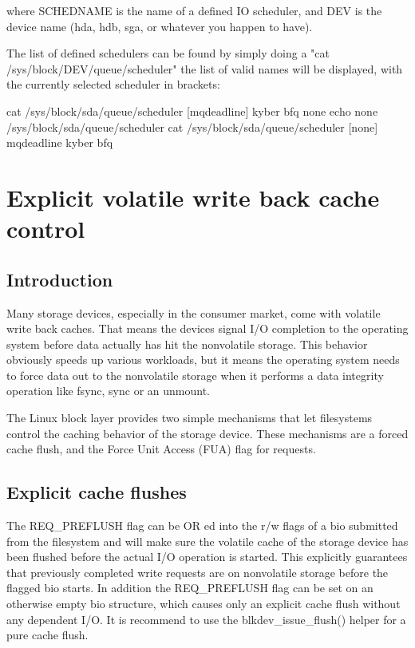 \documentclass[a4paper,11pt,english]{sphinxmanual}
\begin{document}
where SCHEDNAME is the name of a defined IO scheduler, and DEV is the
device name (hda, hdb, sga, or whatever you happen to have).

The list of defined schedulers can be found by simply doing
a "cat /sys/block/DEV/queue/scheduler" \sphinxhyphen{} the list of valid names
will be displayed, with the currently selected scheduler in brackets:

\begin{sphinxVerbatim}[commandchars=\\\{\}]
\PYGZsh{} cat /sys/block/sda/queue/scheduler
[mq\PYGZhy{}deadline] kyber bfq none
\PYGZsh{} echo none \PYGZgt{}/sys/block/sda/queue/scheduler
\PYGZsh{} cat /sys/block/sda/queue/scheduler
[none] mq\PYGZhy{}deadline kyber bfq
\end{sphinxVerbatim}


\chapter{Explicit volatile write back cache control}
\label{\detokenize{writeback_cache_control:explicit-volatile-write-back-cache-control}}\label{\detokenize{writeback_cache_control::doc}}

\section{Introduction}
\label{\detokenize{writeback_cache_control:introduction}}
Many storage devices, especially in the consumer market, come with volatile
write back caches.  That means the devices signal I/O completion to the
operating system before data actually has hit the non\sphinxhyphen{}volatile storage.  This
behavior obviously speeds up various workloads, but it means the operating
system needs to force data out to the non\sphinxhyphen{}volatile storage when it performs
a data integrity operation like fsync, sync or an unmount.

The Linux block layer provides two simple mechanisms that let filesystems
control the caching behavior of the storage device.  These mechanisms are
a forced cache flush, and the Force Unit Access (FUA) flag for requests.


\section{Explicit cache flushes}
\label{\detokenize{writeback_cache_control:explicit-cache-flushes}}
The REQ\_PREFLUSH flag can be OR ed into the r/w flags of a bio submitted from
the filesystem and will make sure the volatile cache of the storage device
has been flushed before the actual I/O operation is started.  This explicitly
guarantees that previously completed write requests are on non\sphinxhyphen{}volatile
storage before the flagged bio starts. In addition the REQ\_PREFLUSH flag can be
set on an otherwise empty bio structure, which causes only an explicit cache
flush without any dependent I/O.  It is recommend to use
the blkdev\_issue\_flush() helper for a pure cache flush.
\end{document}
